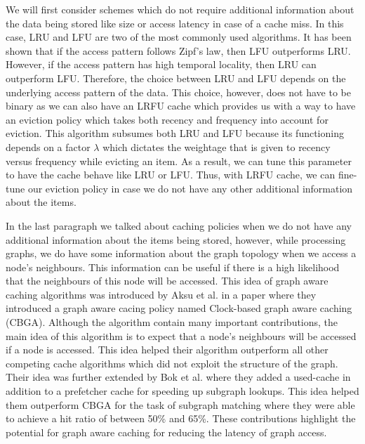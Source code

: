 \medskip
We will first consider schemes which do not require additional information about
the data being stored like size or access latency in case of a cache miss. In
this case, LRU and LFU are two of the most commonly used algorithms. It has been
shown that if the access pattern follows Zipf's law\cite{zipf1929relative}, then
LFU outperforms LRU. However, if the access pattern has high temporal locality,
then LRU can outperform LFU. Therefore, the choice between LRU and LFU depends
on the underlying access pattern of the data. This choice, however, does not
have to be binary as we can also have an LRFU cache\cite{lee2001lrfu} which
provides us with a way to have an eviction policy which takes both recency and
frequency into account for eviction. This algorithm subsumes both LRU and LFU
because its functioning depends on a factor $\lambda$ which dictates the
weightage that is given to recency versus frequency while evicting an item. As a
result, we can tune this parameter to have the cache behave like LRU or LFU.
Thus, with LRFU cache, we can fine-tune our eviction policy in case we do not
have any other additional information about the items.

\medskip
In the last paragraph we talked about caching policies when we do not have any
additional information about the items being stored, however, while processing
graphs, we do have some information about the graph topology when we access a
node's neighbours. This information can be useful if there is a high likelihood
that the neighbours of this node will be accessed. This idea of graph aware
caching algorithms was introduced by Aksu et al. in a paper where they
introduced a graph aware cacing policy named Clock-based graph aware
caching (CBGA)\cite{aksu2015graph}. Although the algorithm contain many 
important contributions, the
main idea of this algorithm is to expect that a node's neighbours will be
accessed if a node is accessed. This idea helped their algorithm outperform all
other competing cache algorithms which did not exploit the structure of the
graph. Their idea was further extended by Bok et al.\cite{bok2020memory} where
they added a used-cache in addition to a prefetcher cache for speeding up
subgraph lookups. This idea helped them outperform CBGA for the task of subgraph
matching where they were able to achieve a hit ratio of between 50\% and 65\%. 
These contributions highlight the potential for graph aware caching for
reducing the latency of graph access.
